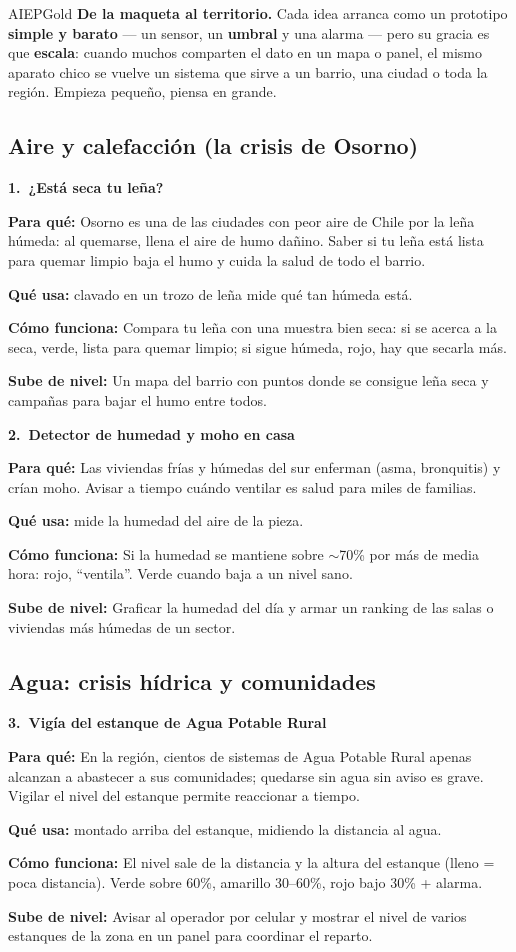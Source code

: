 \documentclass[11pt,letterpaper]{article}
\newcommand{\serig}[1]{%
  \tcbox[on line, colback=AIEPInk, colframe=AIEPInk, boxrule=0pt,
    arc=0.8mm, left=1.8mm, right=1.8mm, top=0.5mm, bottom=0.5mm]%
    {\small\bfseries\textcolor{white}{\texttt{#1}}}%
}
\newcommand{\nivel}[2]{%
  \tcbox[on line, colback=#1!14, colframe=#1, boxrule=0.6pt,
    arc=0.9mm, left=1.8mm, right=1.8mm, top=0.5mm, bottom=0.5mm]%
    {\footnotesize\bfseries\textcolor{#1}{#2}}%
}
\newcommand{\nbasico}{\nivel{AIEPGreen}{Fácil}}
\newcommand{\nmedio}{\nivel{AIEPAmber}{Intermedio}}
\newcommand{\idea}[7]{%
\begin{ideabox}
{\large\bfseries\color{AIEPNavy}#1.\ #2}\hfill#3\par
\vspace{2.5mm}
{\color{AIEPSlate}\textbf{Para qué:}} #4\par\vspace{1.8mm}
{\color{AIEPSlate}\textbf{Qué usa:}} #5\par\vspace{1.8mm}
{\color{AIEPSlate}\textbf{Cómo funciona:}} #6\par\vspace{1.8mm}
{\color{AIEPGreen}\textbf{Sube de nivel:}} #7
\end{ideabox}%
}
\begin{document}
\begin{infobox}{AIEPGold}
\textbf{De la maqueta al territorio.} Cada idea arranca como un prototipo \textbf{simple y barato}
--- un sensor, un \textbf{umbral} y una alarma --- pero su gracia es que \textbf{escala}: cuando
muchos comparten el dato en un mapa o panel, el mismo aparato chico se vuelve un sistema que sirve a
un barrio, una ciudad o toda la región. Empieza pequeño, piensa en grande.
\end{infobox}

\subsection*{\large\textcolor{AIEPGreen}{Aire y calefacción (la crisis de Osorno)}}

\idea{1}{¿Está seca tu leña?}{\nbasico}%
{Osorno es una de las ciudades con peor aire de Chile por la leña húmeda: al quemarse, llena el
aire de humo dañino. Saber si tu leña está lista para quemar limpio baja el humo y cuida la salud
de todo el barrio.}%
{\serig{Soil} clavado en un trozo de leña mide qué tan húmeda está.}%
{Compara tu leña con una muestra bien seca: si se acerca a la seca, verde, lista para quemar
limpio; si sigue húmeda, rojo, hay que secarla más.}%
{Un mapa del barrio con puntos donde se consigue leña seca y campañas para bajar el humo entre todos.}

\idea{2}{Detector de humedad y moho en casa}{\nbasico}%
{Las viviendas frías y húmedas del sur enferman (asma, bronquitis) y crían moho. Avisar a tiempo
cuándo ventilar es salud para miles de familias.}%
{\serig{KY-015} mide la humedad del aire de la pieza.}%
{Si la humedad se mantiene sobre $\sim$70\% por más de media hora: rojo, ``ventila''. Verde cuando
baja a un nivel sano.}%
{Graficar la humedad del día y armar un ranking de las salas o viviendas más húmedas de un sector.}

\subsection*{\large\textcolor{AIEPGreen}{Agua: crisis hídrica y comunidades}}

\idea{3}{Vigía del estanque de Agua Potable Rural}{\nmedio}%
{En la región, cientos de sistemas de Agua Potable Rural apenas alcanzan a abastecer a sus
comunidades; quedarse sin agua sin aviso es grave. Vigilar el nivel del estanque permite reaccionar
a tiempo.}%
{\serig{HC-SR04} montado arriba del estanque, midiendo la distancia al agua.}%
{El nivel sale de la distancia y la altura del estanque (lleno = poca distancia). Verde sobre 60\%,
amarillo 30--60\%, rojo bajo 30\% + alarma.}%
{Avisar al operador por celular y mostrar el nivel de varios estanques de la zona en un panel para
coordinar el reparto.}
\end{document}
